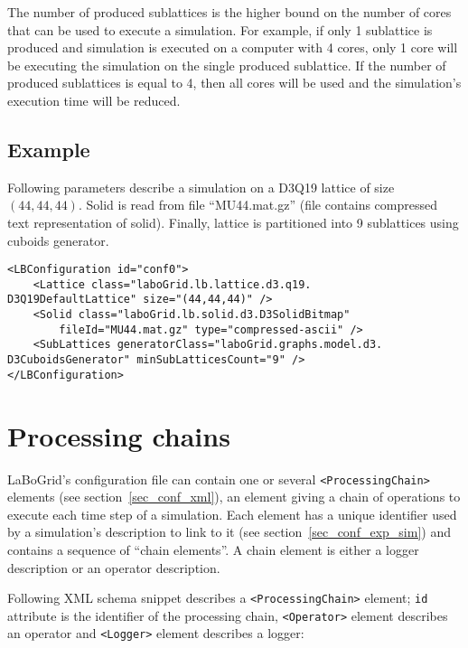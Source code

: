 The number of produced sublattices is the higher bound on the number of cores
that can be used to execute a simulation. For example, if only 1 sublattice is
produced and simulation is executed on a computer with 4 cores, only 1 core will
be executing the simulation on the single produced sublattice. If the number of
produced sublattices is equal to 4, then all cores will be used and the
simulation's execution time will be reduced.


\subsection{Example}

Following parameters describe a simulation on a D3Q19 lattice of size
$(44,44,44)$. Solid is read from file ``MU44.mat.gz'' (file contains compressed
text representation of solid). Finally, lattice is partitioned into 9
sublattices using cuboids generator.

\begin{Verbatim}[tabsize=2,frame=lines]
<LBConfiguration id="conf0">
	<Lattice class="laboGrid.lb.lattice.d3.q19.
D3Q19DefaultLattice" size="(44,44,44)" />
	<Solid class="laboGrid.lb.solid.d3.D3SolidBitmap"
		fileId="MU44.mat.gz" type="compressed-ascii" />
	<SubLattices generatorClass="laboGrid.graphs.model.d3.
D3CuboidsGenerator" minSubLatticesCount="9" />
</LBConfiguration>
\end{Verbatim}

\section{Processing chains}
\label{sec_conf_proc}

LaBoGrid's configuration file can contain one or several
\verb|<ProcessingChain>| elements (see section~\ref{sec_conf_xml}), an element
giving a chain of operations to execute each time step of a simulation. Each
element has a unique identifier used by a simulation's description to link to it (see
section~\ref{sec_conf_exp_sim}) and contains a sequence of ``chain elements''. A
chain element is either a logger description or an operator description.

Following XML schema snippet describes a \verb|<ProcessingChain>| element;
\texttt{id} attribute is the identifier of the processing chain,
\verb|<Operator>| element describes an operator and \verb|<Logger>| element
describes a logger:

